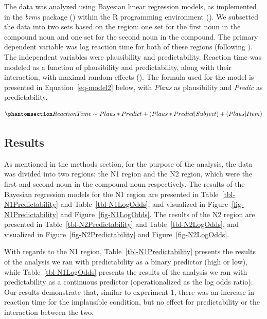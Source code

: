 \documentclass[
  12pt,
  letterpaper,
]{scrreport}
\begin{document}
The data was analyzed using Bayesian linear regression models, as
implemented in the \emph{brms} package
() within
the R programming environment (). We subsetted the data into two sets based on the region: one set
for the first noun in the compound noun and one set for the second noun
in the compound. The primary dependent variable was log reaction time
for both of these regions (following
). The
independent variables were plausibility and predictability. Reaction
time was modeled as a function of plausibility and predictability, along
with their interaction, with maximal random effects
(). The
formula used for the model is presented in Equation~\ref{eq-model2}
below, with \emph{Plaus} as plausibility and \emph{Predic} as
predictability.

\begin{equation}\phantomsection\label{eq-model2}{
Reaction Time\sim Plaus*Predict+(Plaus*Predict|Subject)+(Plaus|Item) 
}\end{equation}

\subsection{Results}\label{results-1}

As mentioned in the methods section, for the purpose of the analysis,
the data was divided into two regions: the N1 region and the N2 region,
which were the first and second noun in the compound noun respectively.
The results of the Bayesian regression models for the N1 region are
presented in Table~\ref{tbl-N1Predictability} and
Table~\ref{tbl-N1LogOdds}, and visualized in
Figure~\ref{fig-N1Predictability} and Figure~\ref{fig-N1LogOdds}. The
results of the N2 region are presented in
Table~\ref{tbl-N2Predictability} and Table~\ref{tbl-N2LogOdds}, and
visualized in Figure~\ref{fig-N2Predictability} and
Figure~\ref{fig-N2LogOdds}.

With regards to the N1 region, Table~\ref{tbl-N1Predictability} presents
the results of the analysis we ran with predictability as a binary
predictor (high or low), while Table~\ref{tbl-N1LogOdds} presents the
results of the analysis we ran with predictability as a continuous
predictor (operationalized as the log odds ratio). Our results
demonstrate that, similar to experiment 1, there was an increase in
reaction time for the implausible condition, but no effect for
predictability or the interaction between the two.
\end{document}
